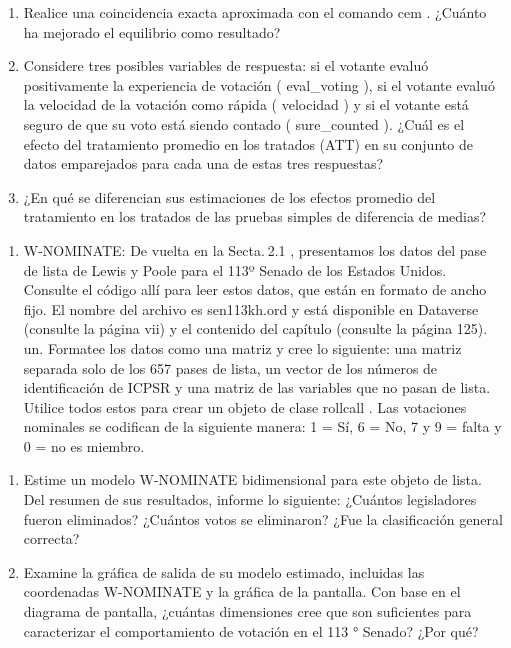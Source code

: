 \documentclass[
]{book}
\providecommand{\tightlist}{%
  \setlength{\itemsep}{0pt}\setlength{\parskip}{0pt}}
\begin{document}
\begin{enumerate}
\def\labelenumi{\Alph{enumi}.}
\setcounter{enumi}{1}
\item
  Realice una coincidencia exacta aproximada con el comando cem . ¿Cuánto ha mejorado el equilibrio como resultado?
\item
  Considere tres posibles variables de respuesta: si el votante evaluó positivamente la experiencia de votación ( eval\_voting ), si el votante evaluó la velocidad de la votación como rápida ( velocidad ) y si el votante está seguro de que su voto está siendo contado ( sure\_counted ). ¿Cuál es el efecto del tratamiento promedio en los tratados (ATT) en su conjunto de datos emparejados para cada una de estas tres respuestas?
\item
  ¿En qué se diferencian sus estimaciones de los efectos promedio del tratamiento en los tratados de las pruebas simples de diferencia de medias?
\end{enumerate}

\begin{enumerate}
\def\labelenumi{\arabic{enumi}.}
\setcounter{enumi}{3}
\tightlist
\item
  W-NOMINATE: De vuelta en la Secta. 2.1 , presentamos los datos del pase de lista de Lewis y Poole para el 113º Senado de los Estados Unidos. Consulte el código allí para leer estos datos, que están en formato de ancho fijo. El nombre del archivo es sen113kh.ord y está disponible en Dataverse (consulte la página vii) y el contenido del capítulo (consulte la página 125).\\
  un.
  Formatee los datos como una matriz y cree lo siguiente: una matriz separada solo de los 657 pases de lista, un vector de los números de identificación de ICPSR y una matriz de las variables que no pasan de lista. Utilice todos estos para crear un objeto de clase rollcall . Las votaciones nominales se codifican de la siguiente manera: 1 = Sí, 6 = No, 7 y 9 = falta y 0 = no es miembro.
\end{enumerate}

\begin{enumerate}
\def\labelenumi{\Alph{enumi}.}
\setcounter{enumi}{1}
\item
  Estime un modelo W-NOMINATE bidimensional para este objeto de lista. Del resumen de sus resultados, informe lo siguiente: ¿Cuántos legisladores fueron eliminados? ¿Cuántos votos se eliminaron? ¿Fue la clasificación general correcta?
\item
  Examine la gráfica de salida de su modelo estimado, incluidas las coordenadas W-NOMINATE y la gráfica de la pantalla. Con base en el diagrama de pantalla, ¿cuántas dimensiones cree que son suficientes para caracterizar el comportamiento de votación en el 113 ° Senado? ¿Por qué?
\end{enumerate}
\end{document}

